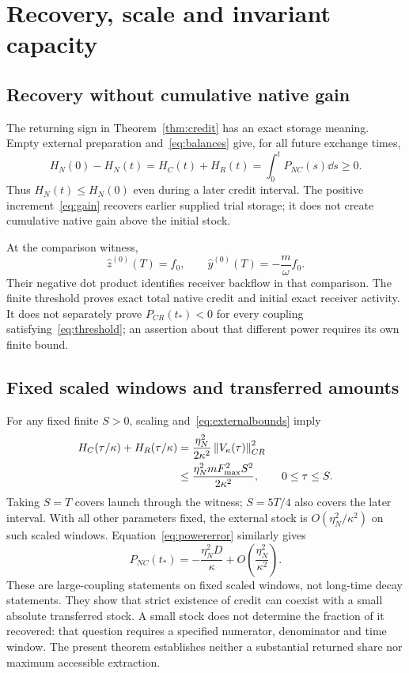 \section{Recovery, scale and invariant capacity}\label{sec:meaning}
\subsection{Recovery without cumulative native gain}\label{sec:account}
The returning sign in Theorem~\ref{thm:credit} has an exact storage meaning. Empty external preparation and~\eqref{eq:balances} give, for all future exchange times,
\begin{equation}\label{eq:cumulative}
H_N(0)-H_N(t)=H_C(t)+H_R(t)
=\int_0^tP_{NC}(s)\dd s\ge0.
\end{equation}
Thus $H_N(t)\le H_N(0)$ even during a later credit interval.
The positive increment~\eqref{eq:gain} recovers earlier supplied trial storage; it does not create cumulative native gain above the initial stock.

At the comparison witness,
\begin{equation}\label{eq:comparisonbackflow}
\widehat z^{(0)}(T)=f_0,\qquad
\widehat y^{(0)}(T)=-\frac m\omega f_0.
\end{equation}
Their negative dot product identifies receiver backflow in that comparison. The finite threshold proves exact total native credit and initial exact receiver activity. It does not separately prove $P_{CR}(t_*)<0$ for every coupling satisfying~\eqref{eq:threshold}; an assertion about that different power requires its own finite bound.

\subsection{Fixed scaled windows and transferred amounts}\label{sec:scales}
For any fixed finite $S>0$, scaling and~\eqref{eq:externalbounds} imply
\begin{equation}\label{eq:stockscale}
\begin{aligned}
H_C(\tau/\kappa)+H_R(\tau/\kappa)
&=\frac{\eta_N^2}{2\kappa^2}\left\|V_\kappa(\tau)\right\|_{CR}^2\\
&\le\frac{\eta_N^2mF_{\max}^2S^2}{2\kappa^2},
\qquad 0\le\tau\le S.
\end{aligned}
\end{equation}
Taking $S=T$ covers launch through the witness; $S=5T/4$ also covers the later interval. With all other parameters fixed, the external stock is
$O(\eta_N^2/\kappa^2)$ on such scaled windows. Equation~\eqref{eq:powererror} similarly gives
\begin{equation}\label{eq:powerscale}
P_{NC}(t_*)=-\frac{\eta_N^2D}{\kappa}
+O\!\left(\frac{\eta_N^2}{\kappa^2}\right).
\end{equation}
These are large-coupling statements on fixed scaled windows, not long-time decay statements. They show that strict existence of credit can coexist with a small absolute transferred stock. A small stock does not determine the fraction of it recovered: that question requires a specified numerator, denominator and time window. The present theorem establishes neither a substantial returned share nor maximum accessible extraction.

